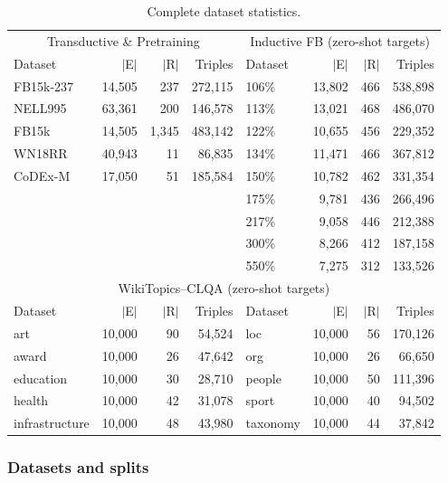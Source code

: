 \documentclass[journal]{IEEEtran}
\begin{document}
\begin{table}[t]
\centering
\caption{Complete dataset statistics.}
\label{tab:datasets}
\small
\begin{tabular}{lrrr|lrrr}
\toprule
\multicolumn{4}{c|}{Transductive \& Pretraining} & \multicolumn{4}{c}{Inductive FB (zero-shot targets)} \\
Dataset & $|$E$|$ & $|$R$|$ & Triples & Dataset & $|$E$|$ & $|$R$|$ & Triples \\
\midrule
FB15k-237 & 14{,}505 & 237 & 272{,}115 & 106\% & 13{,}802 & 466 & 538{,}898 \\
NELL995 & 63{,}361 & 200 & 146{,}578 & 113\% & 13{,}021 & 468 & 486{,}070 \\
FB15k & 14{,}505 & 1{,}345 & 483{,}142 & 122\% & 10{,}655 & 456 & 229{,}352 \\
WN18RR & 40{,}943 & 11 & 86{,}835 & 134\% & 11{,}471 & 466 & 367{,}812 \\
CoDEx-M & 17{,}050 & 51 & 185{,}584 & 150\% & 10{,}782 & 462 & 331{,}354 \\
& & & & 175\% & 9{,}781 & 436 & 266{,}496 \\
& & & & 217\% & 9{,}058 & 446 & 212{,}388 \\
& & & & 300\% & 8{,}266 & 412 & 187{,}158 \\
& & & & 550\% & 7{,}275 & 312 & 133{,}526 \\
\midrule
\multicolumn{8}{c}{WikiTopics--CLQA (zero-shot targets)} \\
Dataset & $|$E$|$ & $|$R$|$ & Triples & Dataset & $|$E$|$ & $|$R$|$ & Triples \\
\midrule
art & 10{,}000 & 90 & 54{,}524 & loc & 10{,}000 & 56 & 170{,}126 \\
award & 10{,}000 & 26 & 47{,}642 & org & 10{,}000 & 26 & 66{,}650 \\
education & 10{,}000 & 30 & 28{,}710 & people & 10{,}000 & 50 & 111{,}396 \\
health & 10{,}000 & 42 & 31{,}078 & sport & 10{,}000 & 40 & 94{,}502 \\
infrastructure & 10{,}000 & 48 & 43{,}980 & taxonomy & 10{,}000 & 44 & 37{,}842 \\
\bottomrule
\end{tabular}
\end{table}





\subsubsection{Datasets and splits}
\end{document}
